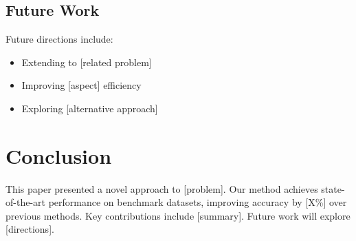 \documentclass[conference]{IEEEtran}
\theoremstyle{plain}
\theoremstyle{definition}
\begin{document}
\subsection{Future Work}

Future directions include:
\begin{itemize}
  \item Extending to [related problem]
  \item Improving [aspect] efficiency
  \item Exploring [alternative approach]
\end{itemize}

\section{Conclusion}
\label{sec:conclusion}

This paper presented a novel approach to [problem]. Our method achieves 
state-of-the-art performance on benchmark datasets, improving accuracy 
by [X\%] over previous methods. Key contributions include [summary]. 
Future work will explore [directions].

\balance



\end{document}
